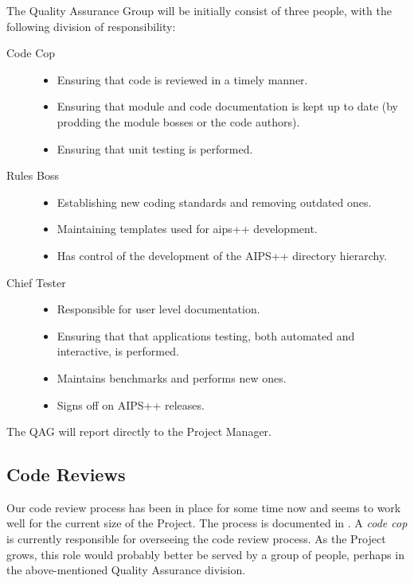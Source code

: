 The Quality Assurance Group will be initially consist of three people,
with the following division of responsibility:

\begin{description}
\item[Code Cop]
\begin{itemize}
\item Ensuring that code is reviewed in a timely manner.
\item Ensuring that module and code documentation is kept up to date (by prodding
  the module bosses or the code authors).
\item Ensuring that unit testing is performed.
\end{itemize}

\item[Rules Boss]
\begin{itemize}
\item Establishing new coding standards and removing outdated ones.
\item Maintaining templates used for aips++ development.
\item Has control of the development of the AIPS++ directory hierarchy.
\end{itemize}

\item[Chief Tester]
\begin{itemize}
\item Responsible for user level documentation.
\item Ensuring that that applications testing, both automated and
  interactive, is performed. 
\item Maintains benchmarks and performs new ones.
\item Signs off on AIPS++ releases.
\end{itemize}
\end{description}

The QAG will report directly to the Project Manager.

\subsection{Code Reviews}

Our code review process has been in place for some time now and seems to work
well for the current size of the Project. The process is documented in 
.
A {\em code cop} is currently responsible for overseeing the code review
process. As the Project grows, this role would probably better be served
by a group of people, perhaps in the above-mentioned Quality Assurance division.

